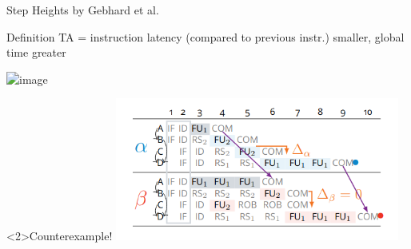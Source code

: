 \documentclass{beamer}
\begin{document}
\begin{frame}{Step Heights by Gebhard et al.}
    \begin{block}{Definition}
        TA = instruction latency (compared to previous instr.) smaller, global time greater
    \end{block}

    \includegraphics<1>[width=\textwidth]{pic/step-height-good.png}

    \begin{alertblock}<2>{Counterexample!}
        \includegraphics[width=0.7\textwidth]{pic/step-height-bad.png}
    \end{alertblock}
\end{frame}
\end{document}
